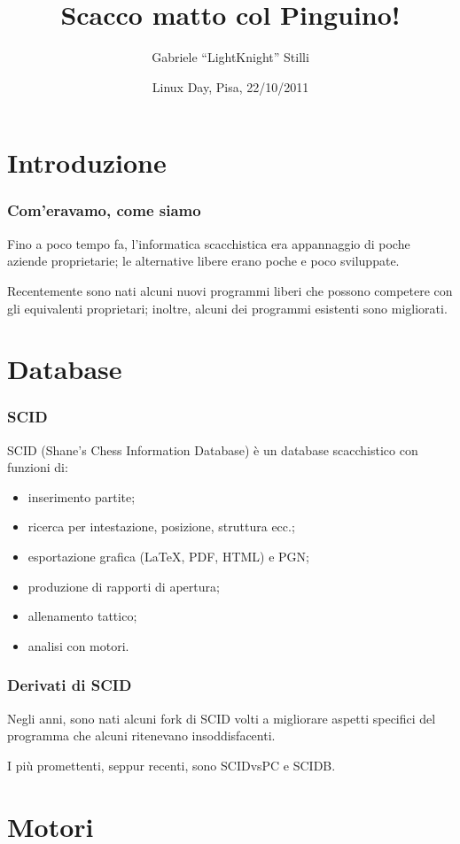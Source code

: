\documentclass{beamer}
\title{Scacco matto col Pinguino!}
\author{Gabriele ``LightKnight'' Stilli}
\institute{G.U.L.P. -- Gruppo Utenti Linux Pisa}
\date{Linux Day, Pisa, 22/10/2011}
\begin{document}
\frame{\titlepage}

\frame{\tableofcontents}
\section{Introduzione}

\begin{frame}\frametitle{Com'eravamo, come siamo}
Fino a poco tempo fa, l'informatica scacchistica era appannaggio di
poche aziende proprietarie; le alternative libere erano poche e poco
sviluppate.

Recentemente sono nati alcuni nuovi programmi liberi che possono
competere con gli equivalenti proprietari; inoltre, alcuni dei
programmi esistenti sono migliorati.
\end{frame}

\section{Database}

\begin{frame}\frametitle{SCID}

SCID (Shane's Chess Information Database) è un database scacchistico
con funzioni di:
\begin{itemize}
\item inserimento partite;
\item ricerca per intestazione, posizione, struttura ecc.;
\item esportazione grafica (\LaTeX, PDF, HTML) e PGN;
\item produzione di rapporti di apertura;
\item allenamento tattico;
\item analisi con motori.
\end{itemize}

\end{frame}

\begin{frame}\frametitle{Derivati di SCID}

Negli anni, sono nati alcuni fork di SCID volti a migliorare aspetti
specifici del programma che alcuni ritenevano insoddisfacenti.

I più promettenti, seppur recenti, sono SCIDvsPC e SCIDB.

\end{frame}

\section{Motori}
\end{document}
